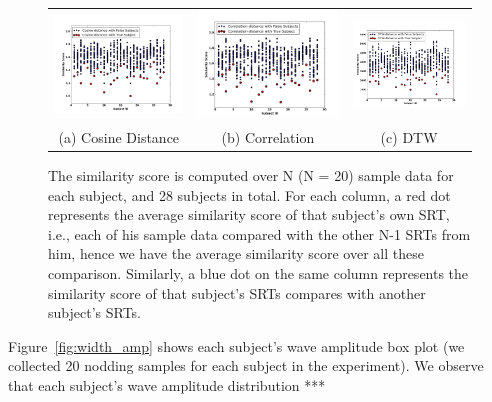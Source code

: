 \begin{figure}[t]
\begin{center}
\begin{tabular}{ccc}
\includegraphics [width=.33\linewidth]{figure/resp_time_cos.png}&
\includegraphics [width=.33\linewidth]{figure/resp_time_cor.png}&
\includegraphics [width=.33\linewidth]{figure/resp_time_dtw.png}\\
(a) Cosine Distance & (b) Correlation & (c) DTW \\
\end{tabular}
\end{center}
\caption{\label{fig:distance} The similarity score is computed over N (N = 20) sample data for each subject, and 28 subjects in total. For each column, a red dot represents the average similarity score of that subject's own SRT, i.e., each of his sample data compared with the other N-1 SRTs from him, hence we have the average similarity score over all these comparison. Similarly, a blue dot on the same column represents the similarity score of that subject's SRTs compares with another subject's SRTs.}
\vspace{-2pt}
\end{figure}


Figure~\ref{fig:width_amp} shows each subject's wave amplitude box plot (we collected 20 nodding samples for each subject in the experiment). We observe that each subject's wave amplitude distribution *** 
 
